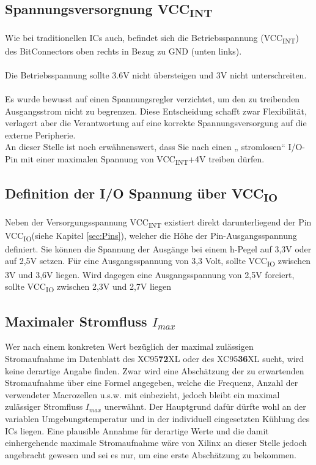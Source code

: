 \documentclass{article}
\begin{document}
\subsection{Spannungsversorgnung VCC\textsubscript{INT}}
Wie bei traditionellen ICs auch, befindet sich die Betriebsspannung (VCC\textsubscript{INT}) des BitConnectors oben rechts  in Bezug zu GND (unten links).
\\\\
Die Betriebsspannung sollte 3.6V nicht übersteigen und 3V nicht unterschreiten. \autocite[3]{XC95_Spec}
\\\\
Es wurde bewusst auf einen Spannungsregler verzichtet, um den zu treibenden Ausgangsstrom nicht zu begrenzen. Diese Entscheidung schafft zwar Flexibilität, verlagert aber die Verantwortung auf eine korrekte Spannungsversorgung auf die externe Peripherie.\\
An dieser Stelle ist noch erwähnenswert, dass Sie nach \autocite[17]{XC95_maxI} einen „ stromlosen“ I/O-Pin mit einer maximalen Spannung von VCC\textsubscript{INT}+4V treiben dürfen.

\subsection{Definition der I/O Spannung über VCC\textsubscript{IO}}

Neben der Versorgungsspannung VCC\textsubscript{INT} existiert direkt darunterliegend der Pin VCC\textsubscript{IO}(siehe Kapitel \ref{sec:Pins}), welcher die Höhe der Pin-Ausgangsspannung definiert. Sie können die Spannung der Ausgänge bei einem h-Pegel auf 3,3V oder auf 2,5V setzen. Für eine Ausgangsspannung von 3,3 Volt, sollte VCC\textsubscript{IO} zwischen 3V und 3,6V liegen. Wird dagegen eine Ausgangsspannung von 2,5V forciert, sollte VCC\textsubscript{IO} zwischen 2,3V und 2,7V liegen \autocite[3]{XC95_Spec}

\subsection{Maximaler Stromfluss $I_{max}$}
\label{sec:max_I}
Wer nach einem konkreten Wert bezüglich der maximal zulässigen Stromaufnahme im Datenblatt \autocite{XC95_Spec} des XC95\textbf{72}XL oder des XC95\textbf{36}XL sucht, wird keine derartige Angabe finden.
Zwar wird eine Abschätzung der zu erwartenden Stromaufnahme über eine Formel angegeben, welche die Frequenz, Anzahl der verwendeter Macrozellen u.s.w. mit einbezieht, jedoch bleibt ein maximal zulässiger Stromfluss $I_{max}$ unerwähnt. Der Hauptgrund dafür dürfte wohl an der variablen Umgebungstemperatur und in der individuell eingesetzten Kühlung des ICs liegen. Eine plausible Annahme für derartige Werte und die damit einhergehende maximale Stromaufnahme wäre von Xilinx an dieser Stelle jedoch angebracht gewesen und sei es nur, um eine erste Abschätzung zu bekommen.\\
\end{document}
